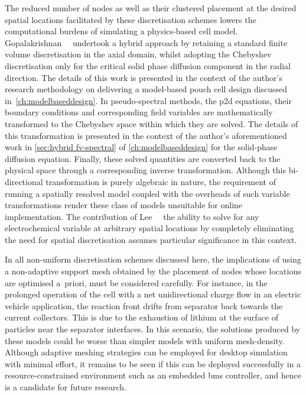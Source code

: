 The  reduced  number   of  nodes  as  well  as  their   clustered  placement  at
the  desired  spatial  locations  facilitated by  these  discretisation  schemes
lowers  the computational  burdens  of simulating  a  physics-based cell  model.
Gopalakrishnan~\etal{}~\cite{Gopalakrishnan2018} undertook a  hybrid approach by
retaining a  standard finite volume  discretisation in the axial  domain, whilst
adopting  the  Chebyshev  discretisation  only  for  the  critical  solid  phase
diffusion  component in  the  radial  direction. The  details  of  this work  is
presented  in the  context of  the author's  research methodology  on delivering
a  model-based pouch  cell  design  discussed in~\cref{ch:modelbaseddesign}.  In
pseudo-spectral methods, the \gls{p2d}  equations, their boundary conditions and
corresponding field  variables are  mathematically transformed to  the Chebyshev
space  within  which  they  are  solved.  The  details  of  this  transformation
is  presented   in  the   context  of  the   author's  aforementioned   work  in
\cref{sec:hybrid fv-spectral} of  \cref{ch:modelbaseddesign} for the solid-phase
diffusion equation. Finally,  these solved quantities are converted  back to the
physical  space through  a corresponding  inverse transformation.  Although this
bi-directional  transformation is  purely algebraic  in nature,  the requirement
of  running a  spatially  resolved  model coupled  with  the  overheads of  such
variable  transformations render  these class  of models  unsuitable for  online
implementation. The contribution  of Lee~\etal~\cite{Lee2012a,Lee2012} \ie{} the
ability to solve for any electrochemical variable at arbitrary spatial locations
by completely eliminating the need for spatial discretisation assumes particular
significance in this context.


In all  non-uniform discretisation schemes  discussed here, the  implications of
using  a non-adaptive  support mesh  obtained by  the placement  of nodes  whose
locations are optimised a~priori, must be considered carefully. For instance, in
the prolonged operation of the cell  with a net unidirectional charge flow \eg{}
in an  electric vehicle  application, the reaction  front drifts  from separator
back towards the current collectors. This is due to the exhaustion of lithium at
the surface  of particles near the  separator interfaces. In this  scenario, the
solutions  produced by  these models  could be  worse than  simpler models  with
uniform mesh-density. Although  adaptive meshing strategies can  be employed for
desktop simulation  with minimal effort,  it remains to be  seen if this  can be
deployed successfully in a resource-constrained  environment such as an embedded
\gls{bms} controller, and hence is  a candidate for future research.


